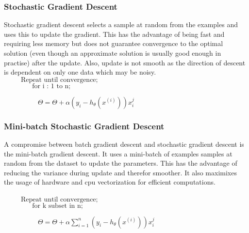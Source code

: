 \documentclass[11pt,a4paper,titlepage,landscape]{book}
\begin{document}
	\subsubsection{Stochastic Gradient Descent}
	Stochastic gradient descent selects a sample at random from the examples and uses this to update the gradient. This has the advantage of being fast and requiring less memory but does not guarantee convergence to the optimal solution (even though an approximate solution is usually good enough in practise) after the update. Also, update is not smooth as the direction of descent is dependent on only one data which may be noisy. \\
	${}\hspace{30pt} \text{Repeat until convergence;} $\\
	${}\hspace{50pt} \text{for i : 1 to n;} $
	
	${}\hspace{60pt} \Theta = \Theta + \alpha\left(y_i - h_\theta(x^{(i)})\right)x_i^j $
	
	\subsubsection{Mini-batch Stochastic Gradient Descent}
	A compromise between batch gradient descent and stochastic gradient descent is the mini-batch gradient descent. It uses a mini-batch of examples samples at random from the dataset  to update the parameters. This has the advantage of reducing the variance during update and therefor smoother. It also maximixes the usage of hardware and cpu vectorization for efficient computations. \\ \\
	${}\hspace{30pt} \text{Repeat until convergence;} $\\
	${}\hspace{50pt} \text{for k subset in n;} $
	 
	${}\hspace{60pt}\Theta = \Theta + \alpha\sum_{i=1}^{n}\left(y_i - h_\theta(x^{(i)})\right)x_i^j $
	 	
\end{document}
